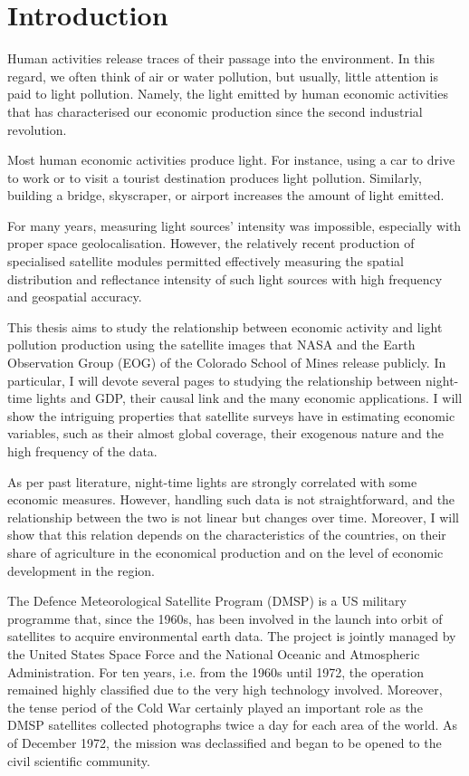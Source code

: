 \chapter{Introduction}\label{ch:introduction}
Human activities release traces of their passage into the environment. In this regard, we often think of air or water pollution, but usually, little attention is paid to light pollution. Namely, the light emitted by human economic activities that has characterised our economic production since the second industrial revolution.

Most human economic activities produce light. For instance, using a car to drive to work or to visit a tourist destination produces light pollution. Similarly, building a bridge, skyscraper, or airport increases the amount of light emitted.

For many years, measuring light sources' intensity was impossible, especially with proper space geolocalisation. However, the relatively recent production of specialised satellite modules permitted effectively measuring the spatial distribution and reflectance intensity of such light sources with high frequency and geospatial accuracy.

This thesis aims to study the relationship between economic activity and light pollution production using the satellite images that NASA and the Earth Observation Group (EOG) of the Colorado School of Mines release publicly. In particular, I will devote several pages to studying the relationship between night-time lights and GDP, their causal link and the many economic applications. I will show the intriguing properties that satellite surveys have in estimating economic variables, such as their almost global coverage, their exogenous nature and the high frequency of the data. 

As per past literature, night-time lights are strongly correlated with some economic measures. However, handling such data is not straightforward, and the relationship between the two is not linear but changes over time. Moreover, I will show that this relation depends on the characteristics of the countries, on their share of agriculture in the economical production and on the level of economic development in the region.

The Defence Meteorological Satellite Program (DMSP) is a US military programme that, since the 1960s, has been involved in the launch into orbit of satellites to acquire environmental earth data. The project is jointly managed by the United States Space Force and the National Oceanic and Atmospheric Administration.
For ten years, i.e. from the 1960s until 1972, the operation remained highly classified due to the very high technology involved. Moreover, the tense period of the Cold War certainly played an important role as the DMSP satellites collected photographs twice a day for each area of the world.
As of December 1972, the mission was declassified and began to be opened to the civil scientific community.

